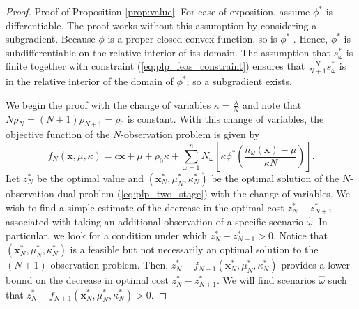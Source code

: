 \documentclass[opre,nonblindrev]{informs3} %
\newcommand{\x}{\mathbf{x}}
\begin{document}
\begin{proof}{\sc Proof of Proposition \ref{prop:value}.}
	For ease of exposition, assume $\phi^*$ is differentiable.
	The proof works without this assumption by considering a subgradient.
	Because $\phi$ is a proper closed convex function, so is $\phi^*$ \citep[Theorem 12.2]{rockafellar_70}.
	Hence,  $\phi^*$ is subdifferentiable on the relative interior of its domain. %
	The assumption that $s^*_\omega$ is finite together with constraint (\ref{eq:plp_feas_constraint}) ensures that $\frac{N}{N+1}s^*_\omega$ is in the relative interior of the domain of $\phi^{*}$; so a subgradient exists. 

	We begin the proof with the change of variables $\kappa = \frac{\lambda}{N}$ and note that $N\rho_N = (N+1)\rho_{N+1} =\rho_0$ is constant.	
	With this change of variables, the objective function of the $N$-observation problem is given by
	\[
		f_N(\x,\mu,\kappa) = c\x + \mu + \rho_0 \kappa + \sum_{\omega = 1}^n N_\omega \left[ \kappa \phi^*\left(\frac{h_\omega(\x) - \mu}{\kappa N} \right) \right].
	\]
	Let $z_N^*$ be the optimal value and  $(\x^*_N,\mu^*_N,\kappa^*_N)$ be the optimal solution of the $N$-observation dual problem (\ref{eq:plp_two_stage}) with the change of variables.
	We wish to find a simple estimate of the decrease in the optimal cost $z_N^* - z_{N+1}^*$ associated with taking an additional observation of a specific scenario $\hat{\omega}$.
In particular, we look for a condition under which $z_N^* - z_{N+1}^* > 0$.	
	Notice that $(\x^*_N,\mu^*_N,\kappa^*_N)$ is a feasible but not necessarily an optimal solution to the $(N+1)$-observation problem.
	Then, $z_N^* - f_{N+1}(\x^*_N,\mu^*_N,\kappa^*_N)$ provides a lower bound on the decrease in optimal cost $z_N^* - z_{N+1}^*$.
	We will find scenarios $\hat{\omega}$ such that $z_N^* - f_{N+1}(\x^*_N,\mu^*_N,\kappa^*_N) > 0$.


\end{proof}
\end{document}

